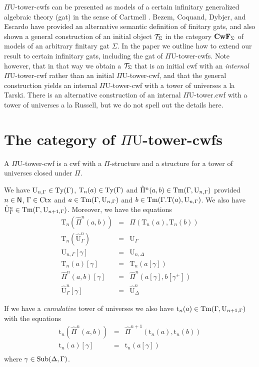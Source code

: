 \documentclass{lmcs}
\def\UU{\mathrm{U}}
\def\Ta{\mathrm{T}}
\def\Pihat{\hat{\Pi}}
\def\UUhat{\hat{\UU}}
\def\t{\mathrm{t}}
\begin{document}
$\Pi\UU$-tower-cwfs can be presented as models of a certain infinitary generalized algebraic theory (gat) in the sense of Cartmell \cite{cartmell:phd}. Bezem, Coquand, Dybjer, and Escardo \cite{bezem:hofmann} have provided an alternative semantic definition of finitary gats, and also shown a general construction of an initial object ${\mathcal T}_\Sigma$ in the category $\textbf{CwF}_\Sigma$ of models of an arbitrary finitary gat $\Sigma$. In the paper we outline how to extend our result to certain infinitary gats, including the gat of $\Pi\UU$-tower-cwfs. Note however, that in that way we obtain a ${\mathcal T}_\Sigma$ that is an initial cwf with an {\em internal} $\Pi\UU$-tower-cwf rather than an initial $\Pi\UU$-tower-cwf, and that the general construction yields an internal $\Pi\UU$-tower-cwf with a tower of universes a la Tarski. There is an alternative construction of an internal $\Pi\UU$-tower.cwf with a tower of universes a la Russell, but we do not spell out the details here.

\section{The category of $\Pi\UU$-tower-cwfs}

 A $\Pi \UU$-tower-cwf is a cwf with a $\Pi$-structure and a structure for a tower of universes closed under $\Pi$.
 
 We have $\UU_{n,\Gamma} \in \Ty(\Gamma)$, $\Ta_n(a) \in \Ty(\Gamma)$ and $\Pihat^n(a,b) \in \Tm(\Gamma,\UU_{n,\Gamma})$ provided $n \in \mathsf{N}$, $\Gamma \in \mathrm{Ctx}$ and $a  \in \Tm(\Gamma,\UU_{n,\Gamma})$ and 
$b \in \Tm(\Gamma . \Ta(a),\UU_{n,\Gamma})$. 
We also have $\UUhat^n_{\Gamma} \in \Tm(\Gamma,\UU_{n+1,\Gamma})$.
Moreover, we have the equations
\begin{eqnarray*}
\Ta_n(\Pihat^n(a,b)) &= &\Pi(\Ta_n(a),\Ta_n(b))\\
\Ta_n(\UUhat^n_{\Gamma}) &= &\UU_{\Gamma}\\
\UU_{n,\Gamma}[\gamma] &=& \UU_{n,\Delta}\\
\Ta_n(a)[\gamma] &=& \Ta_n(a[\gamma])\\
\Pihat^n(a,b)[\gamma] &=& \Pihat^n(a[\gamma],b[\gamma^+])\\
\UUhat^n_\Gamma[\gamma] &=& \UUhat^n_\Delta
\end{eqnarray*}

If we have a {\em cumulative} tower of universes we also have $\t_n(a) \in \Tm(\Gamma,\UU_{n+1,\Gamma})$ with the equations
\begin{eqnarray*}
\t_n(\Pihat^n(a,b)) &= &\Pihat^{n+1}(\t_n(a),\t_n(b))\\
\t_n(a)[\gamma] &=& \t_n(a[\gamma])\\
\end{eqnarray*}
where $\gamma \in \mathrm{Sub}(\Delta,\Gamma)$.
\end{document}
